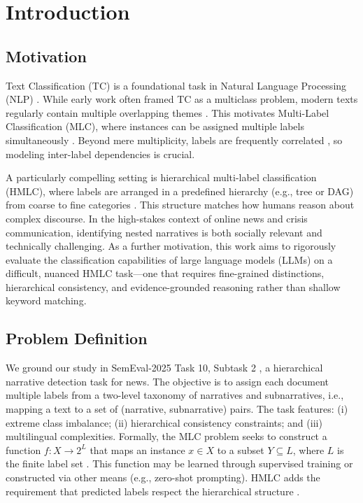 \chapter{Introduction}

\section{Motivation}
Text Classification (TC) is a foundational task in Natural Language Processing (NLP) \cite{Zangari2024}. While early work often framed TC as a multiclass problem, modern texts regularly contain multiple overlapping themes \cite{Hu2025, TidakeSane2018}. This motivates Multi-Label Classification (MLC), where instances can be assigned multiple labels simultaneously \cite{TidakeSane2018}. Beyond mere multiplicity, labels are frequently correlated \cite{TidakeSane2018, Huang2024}, so modeling inter-label dependencies is crucial.

A particularly compelling setting is hierarchical multi-label classification (HMLC), where labels are arranged in a predefined hierarchy (e.g., tree or DAG) from coarse to fine categories \cite{liu2023recentadvanceshierarchicalmultilabel}. This structure matches how humans reason about complex discourse. In the high-stakes context of online news and crisis communication, identifying nested narratives is both socially relevant and technically challenging. As a further motivation, this work aims to rigorously evaluate the classification capabilities of large language models (LLMs) on a difficult, nuanced HMLC task—one that requires fine-grained distinctions, hierarchical consistency, and evidence-grounded reasoning rather than shallow keyword matching.

\section{Problem Definition}
We ground our study in SemEval-2025 Task 10, Subtask 2 \cite{semeval2025task10}, a hierarchical narrative detection task for news. The objective is to assign each document multiple labels from a two-level taxonomy of narratives and subnarratives, i.e., mapping a text to a set of (narrative, subnarrative) pairs. The task features: (i) extreme class imbalance; (ii) hierarchical consistency constraints; and (iii) multilingual complexities. Formally, the MLC problem seeks to construct a function $f: X \to 2^L$ that maps an instance $x \in X$ to a subset $Y \subseteq L$, where $L$ is the finite label set \cite{TidakeSane2018}. This function may be learned through supervised training or constructed via other means (e.g., zero-shot prompting). HMLC adds the requirement that predicted labels respect the hierarchical structure \cite{liu2023recentadvanceshierarchicalmultilabel}.

